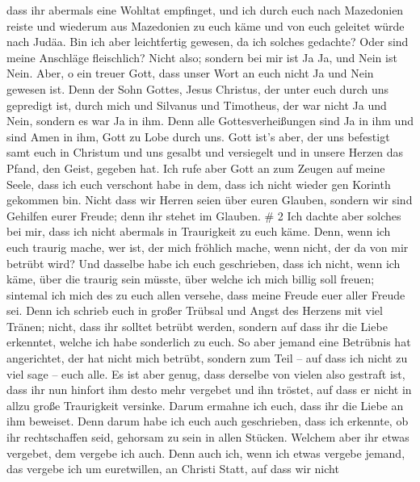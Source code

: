 dass ihr abermals eine Wohltat empfinget,  und ich durch
euch nach Mazedonien reiste und wiederum aus Mazedonien zu euch käme und
von euch geleitet würde nach Judäa.  Bin ich aber
leichtfertig gewesen, da ich solches gedachte? Oder sind meine Anschläge
fleischlich? Nicht also; sondern bei mir ist Ja Ja, und Nein ist Nein.
 Aber, o ein treuer Gott, dass unser Wort an euch nicht Ja
und Nein gewesen ist.  Denn der Sohn Gottes, Jesus
Christus, der unter euch durch uns gepredigt ist, durch mich und
Silvanus und Timotheus, der war nicht Ja und Nein, sondern es war Ja in
ihm.  Denn alle Gottesverheißungen sind Ja in ihm und sind
Amen in ihm, Gott zu Lobe durch uns.  Gott ist's aber, der
uns befestigt samt euch in Christum und uns gesalbt  und
versiegelt und in unsere Herzen das Pfand, den Geist, gegeben hat.
 Ich rufe aber Gott an zum Zeugen auf meine Seele, dass ich
euch verschont habe in dem, dass ich nicht wieder gen Korinth gekommen
bin.  Nicht dass wir Herren seien über euren Glauben,
sondern wir sind Gehilfen eurer Freude; denn ihr stehet im Glauben. \# 2
 Ich dachte aber solches bei mir, dass ich nicht abermals in
Traurigkeit zu euch käme.  Denn, wenn ich euch traurig
mache, wer ist, der mich fröhlich mache, wenn nicht, der da von mir
betrübt wird?  Und dasselbe habe ich euch geschrieben, dass
ich nicht, wenn ich käme, über die traurig sein müsste, über welche ich
mich billig soll freuen; sintemal ich mich des zu euch allen versehe,
dass meine Freude euer aller Freude sei.  Denn ich schrieb
euch in großer Trübsal und Angst des Herzens mit viel Tränen; nicht,
dass ihr solltet betrübt werden, sondern auf dass ihr die Liebe
erkenntet, welche ich habe sonderlich zu euch.  So aber
jemand eine Betrübnis hat angerichtet, der hat nicht mich betrübt,
sondern zum Teil -- auf dass ich nicht zu viel sage -- euch alle.
 Es ist aber genug, dass derselbe von vielen also gestraft
ist,  dass ihr nun hinfort ihm desto mehr vergebet und ihn
tröstet, auf dass er nicht in allzu große Traurigkeit versinke.
 Darum ermahne ich euch, dass ihr die Liebe an ihm beweiset.
 Denn darum habe ich euch auch geschrieben, dass ich
erkennte, ob ihr rechtschaffen seid, gehorsam zu sein in allen Stücken.
 Welchem aber ihr etwas vergebet, dem vergebe ich auch.
Denn auch ich, wenn ich etwas vergebe jemand, das vergebe ich um
euretwillen, an Christi Statt,  auf dass wir nicht

